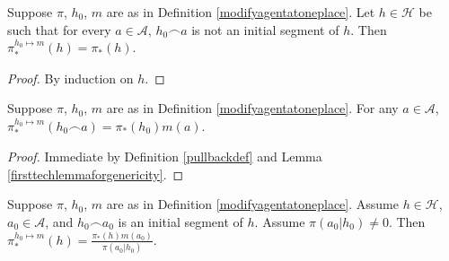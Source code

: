 \documentclass[runningheads]{llncs}
\begin{document}
\begin{lemma}
\label{firsttechlemmaforgenericity}
    Suppose $\pi$, $h_0$, $m$ are as in Definition \ref{modifyagentatoneplace}.
    Let $h\in\mathcal H$ be such that
    for every $a\in\mathcal A$,
    $h_0\frown a$ is not an initial segment of $h$.
    Then $\pi^{h_0\mapsto m}_*(h)=\pi_*(h)$.
\end{lemma}

\begin{proof}
    By induction on $h$.
\end{proof}

\begin{lemma}
\label{thirdtechlemmaforgenericity}
    Suppose $\pi$, $h_0$, $m$ are as in Definition \ref{modifyagentatoneplace}.
    For any $a\in\mathcal A$,
    $\pi^{h_0\mapsto m}_*(h_0\frown a)=\pi_*(h_0)m(a)$.
\end{lemma}

\begin{proof}
    Immediate by Definition \ref{pullbackdef} and Lemma \ref{firsttechlemmaforgenericity}.
\end{proof}

\begin{lemma}
\label{secondtechlemmaforgenericity}
    Suppose $\pi$, $h_0$, $m$ are as in Definition \ref{modifyagentatoneplace}.
    Assume $h\in\mathcal H$, $a_0\in\mathcal A$, and $h_0\frown a_0$ is
    an initial segment of $h$. Assume $\pi(a_0|h_0)\not=0$. Then
    $\pi^{h_0\mapsto m}_*(h) = \frac{\pi_*(h)m(a_0)}{\pi(a_0|h_0)}$.
\end{lemma}
\end{document}

